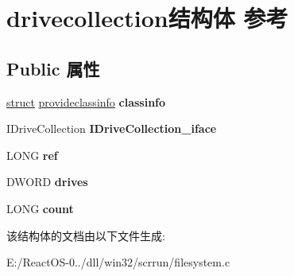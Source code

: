 \hypertarget{structdrivecollection}{}\section{drivecollection结构体 参考}
\label{structdrivecollection}
\subsection*{Public 属性}
\begin{DoxyCompactItemize}
\item 
\mbox{\label{structdrivecollection_aeb092da11dc2c5009811006a903a6076}} 
\hyperlink{interfacestruct}{struct} \hyperlink{structprovideclassinfo}{provideclassinfo} {\bfseries classinfo}
\item 
\mbox{\label{structdrivecollection_a66c95b027960cd9c6796f52e784fd874}} 
I\+Drive\+Collection {\bfseries I\+Drive\+Collection\+\_\+iface}
\item 
\mbox{\label{structdrivecollection_a5fcb9c6452b7b25f3c67942e250523e5}} 
L\+O\+NG {\bfseries ref}
\item 
\mbox{\label{structdrivecollection_a5faa1df25230b9368e8e4b484abc2319}} 
D\+W\+O\+RD {\bfseries drives}
\item 
\mbox{\label{structdrivecollection_ace6a76ebdaa89d9a53dff771ef5afe67}} 
L\+O\+NG {\bfseries count}
\end{DoxyCompactItemize}


该结构体的文档由以下文件生成\+:\begin{DoxyCompactItemize}
\item 
E\+:/\+React\+O\+S-\/0../dll/win32/scrrun/filesystem.\+c\end{DoxyCompactItemize}
